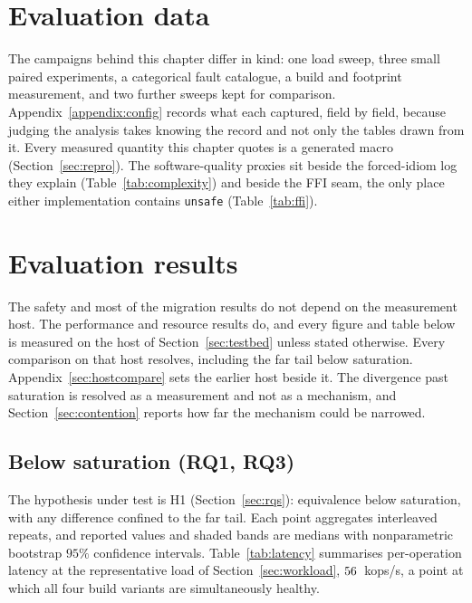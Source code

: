 \documentclass[english,oneside,a4paper,censored,csm,software-track-2020]{HYthesisML}
\begin{document}
\section{Evaluation data}\label{sec:evaldata}
The campaigns behind this chapter differ in kind: one load sweep, three small paired experiments, a
categorical fault catalogue, a build and footprint measurement, and two further sweeps kept for
comparison. Appendix~\ref{appendix:config} records what each captured, field by field, because
judging the analysis takes knowing the record and not only the tables drawn from it. Every
measured quantity this chapter quotes is a generated macro (Section~\ref{sec:repro}). The
software-quality proxies sit beside the forced-idiom log they explain
(Table~\ref{tab:complexity}) and beside the FFI seam, the only place either implementation contains
\texttt{unsafe} (Table~\ref{tab:ffi}).

\section{Evaluation results}
The safety and most of the migration results do not depend on the measurement host. The
performance and resource results do, and every figure and table below is measured on the host of
Section~\ref{sec:testbed} unless stated otherwise. Every comparison on that host resolves, including
the far tail below saturation. Appendix~\ref{sec:hostcompare} sets the earlier host beside it.
The divergence past saturation is resolved as a measurement and not as a mechanism, and
Section~\ref{sec:contention} reports how far the mechanism could be narrowed.

\subsection{Below saturation (RQ1, RQ3)}\label{sec:perfresults}
The hypothesis under test is H1 (Section~\ref{sec:rqs}): equivalence below saturation, with any
difference confined to the far tail. Each point aggregates \NRepeats{} interleaved repeats, and
reported values and shaded bands are medians with nonparametric bootstrap $95\%$ confidence
intervals. Table~\ref{tab:latency} summarises per-operation latency at the representative load of
Section~\ref{sec:workload}, $56$~kops/s, a point at which all four build variants are
simultaneously healthy.
\end{document}
